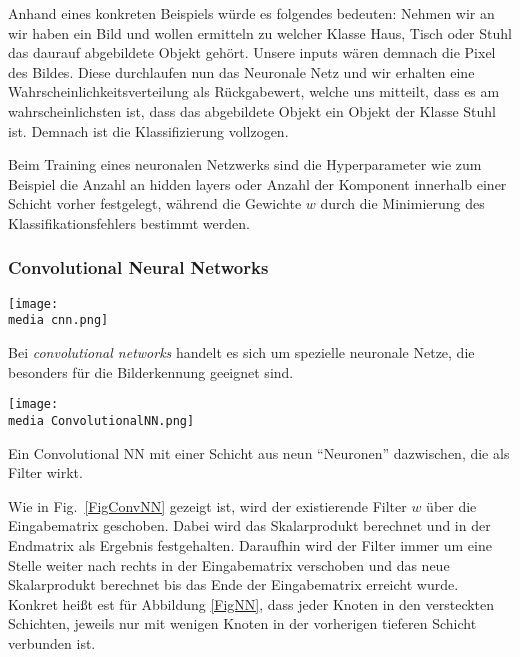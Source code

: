 Anhand eines konkreten Beispiels würde es folgendes bedeuten:
Nehmen wir an wir haben ein Bild und wollen ermitteln zu welcher Klasse Haus, Tisch oder Stuhl das daurauf abgebildete Objekt gehört. Unsere inputs wären demnach die Pixel des Bildes. Diese durchlaufen nun das Neuronale Netz und wir erhalten eine Wahrscheinlichkeitsverteilung als Rückgabewert, welche uns mitteilt, dass es am wahrscheinlichsten ist, dass das abgebildete Objekt ein Objekt der Klasse Stuhl ist. Demnach ist die Klassifizierung vollzogen.

Beim Training eines neuronalen Netzwerks sind die Hyperparameter wie zum Beispiel die Anzahl an hidden layers oder Anzahl der Komponent innerhalb einer Schicht vorher festgelegt, w\"ahrend die Gewichte $w$ durch die Minimierung des Klassifikationsfehlers bestimmt werden.

\subsubsection{Convolutional Neural Networks}
\label{ml:cnn}
\begin{dsafigure}
  \centering
		\texttt{[image: \\media cnn.png]}
		\caption{Ein Convolutional Neural Network (CNN) (deutsch \enquote{faltendes neurales Netzwerk}) %
		}
		\label{FigConvNN}
\end{dsafigure}
\noindent Bei \emph{convolutional networks} handelt es sich um spezielle neuronale Netze, die besonders für die Bilderkennung geeignet sind.

\begin{dsafigure}
  \centering
		\texttt{[image: \\media ConvolutionalNN.png]}
		\caption{Ein Convolutional NN mit einer Schicht aus neun \enquote{Neuronen} dazwischen, die als Filter wirkt. }
		\label{FigConvNN}
\end{dsafigure}

Wie in Fig.~\ref{FigConvNN} gezeigt ist, wird der existierende Filter $w$ über die Eingabematrix geschoben. Dabei wird das Skalarprodukt berechnet und in der Endmatrix als Ergebnis festgehalten. Daraufhin wird der Filter immer um eine Stelle weiter nach rechts in der Eingabematrix verschoben und das neue Skalarprodukt berechnet bis das Ende der Eingabematrix erreicht wurde. Konkret hei\ss t est f\"ur Abbildung \ref{FigNN}, dass jeder Knoten in den versteckten Schichten, jeweils nur mit wenigen Knoten in der vorherigen tieferen Schicht verbunden ist. 

